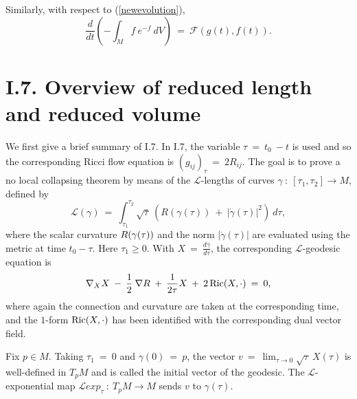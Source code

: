 Similarly, with respect to (\ref{newevolution}),
\begin{equation}
\frac{d}{dt} \left(- \int_M f
\: e^{-f} \: dV \right) \:
 = \: {\mathcal F}(g(t), f(t)).
\end{equation}

\section{I.7. Overview of reduced length and reduced volume} \label{I.7}

We first give a brief summary of I.7.
In I.7, the variable $\tau \: = \: t_0 \: - t$ is used and so the
corresponding Ricci flow equation is $(g_{ij})_\tau \: = \: 2 R_{ij}$.
The goal is to prove a no local collapsing theorem
by means of the ${\mathcal L}$-lengths of curves
$\gamma \: : \: [\tau_1, \tau_2] \rightarrow M$, defined by
\begin{equation} \label{defL}
{\mathcal L}(\gamma) \: = \:
\int_{\tau_1}^{\tau_2} \sqrt{\tau} \: \left( R(\gamma(\tau)) \: + \:
\big| \dot{\gamma}(\tau) \big|^2 \right) \: d\tau,
\end{equation}
where the scalar curvature $R(\gamma(\tau))$ and the norm $|\dot{\gamma}(\tau)|$
are evaluated using the metric at time $t_0-\tau$.
Here $\tau_1 \ge 0$.
With $X \: = \: \frac{d\gamma}{d\tau}$,
the corresponding ${\mathcal L}$-geodesic equation is
\begin{equation}
\nabla_X X \: - \: \frac12 \: \nabla R \: + \: \frac{1}{2\tau} X \: + \:
2 \operatorname{Ric}(X, \cdot) \: = \: 0,
\end{equation}
where again the connection and curvature are taken at the corresponding time,
and the $1$-form $\operatorname{Ric}(X,\cdot)$ has been identified with the
corresponding dual vector field.

Fix $p \in M$.
Taking $\tau_1 \: = \: 0$ and $\gamma(0) \: = \: p$,
the vector $v \: = \: \lim_{\tau \rightarrow 0}
\sqrt{\tau} \: X(\tau)$ is well-defined in $T_pM$
and is called the initial vector of the geodesic. The
${\mathcal L}$-exponential map ${\mathcal L}exp_\tau \: : \: T_p M
\rightarrow M$ sends $v$ to $\gamma(\tau)$.

